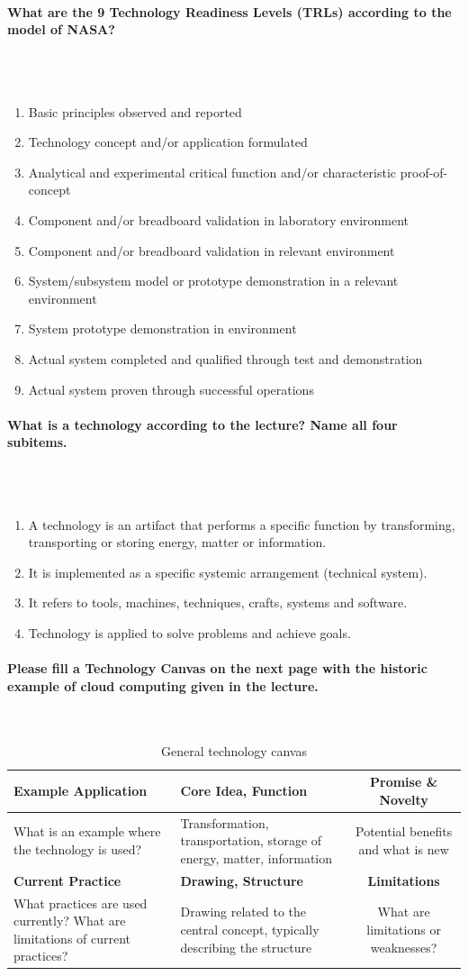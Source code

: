 \documentclass[10pt,a4paper,noendnumber=true]{scrartcl}
\newcommand{\properparagraph}[1]{\paragraph{\textcolor{Emerald}{#1}}\mbox{}\\}
\begin{document}
\properparagraph{ What are the 9 Technology Readiness Levels (TRLs) according to the model of NASA?}
\\[-6ex]
\begin{enumerate}
	\item Basic principles observed and reported
	\item Technology concept and/or application formulated
	\item Analytical and experimental critical function and/or characteristic proof-of-concept
	\item Component and/or breadboard validation in laboratory environment
	\item Component and/or breadboard validation in relevant environment
	\item System/subsystem model or prototype demonstration in a relevant environment
	\item System prototype demonstration in environment
	\item Actual system completed and qualified through test and demonstration
	\item Actual system proven through successful operations 
\end{enumerate}

\properparagraph{What is a technology according to the lecture? Name all four subitems.}
\\[-6ex]
\begin{enumerate}
	\item A technology is an artifact that performs a specific function by transforming, transporting or storing energy, matter or information.
	\item It is implemented as a specific systemic arrangement (technical system).
	\item It refers to tools, machines, techniques, crafts, systems and software.
	\item Technology is applied to solve problems and achieve goals.
\end{enumerate}


\properparagraph{Please fill a Technology Canvas on the next page with the historic example of cloud computing given in the lecture.}
\begin{table}[H]
		\centering
		\caption{General technology canvas}
		\begin{tabularx}{\textwidth}{XXc}
			\toprule
			\textbf{Example Application} & \textbf{Core Idea, Function} & \textbf{Promise \& Novelty} \\
			\midrule
			What is an example where the technology is used? & Transformation, transportation, storage of energy, matter, information & Potential benefits and what is new \\
			\midrule
			\textbf{Current Practice} & \textbf{Drawing, Structure} & \textbf{Limitations} \\
			\midrule
			What practices are used currently? What are limitations of current practices? & Drawing related to the central concept, typically describing the structure & What are limitations or weaknesses? \\
			\bottomrule
		\end{tabularx}
\end{table}
\end{document}
